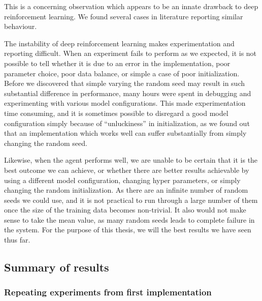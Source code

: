 This is a concerning observation which appears to be an innate drawback to deep reinforcement learning. We found several cases in literature reporting similar behaviour. \cite{rlblogpost}

The instability of deep reinforcement learning makes experimentation and reporting difficult. When an experiment fails to perform as we expected, it is not possible to tell whether it is due to an error in the implementation, poor parameter choice, poor data balance, or simple a case of poor initialization. Before we discovered that simple varying the random seed may result in such substantial difference in performance, many hours were spent in debugging and experimenting with various model configurations. This made experimentation time consuming, and it is sometimes possible to disregard a good model configuration simply because of ``unluckiness'' in initialization, as we found out that an implementation which works well can suffer substantially from simply changing the random seed.

Likewise, when the agent performs well, we are unable to be certain that it is the best outcome we can achieve, or whether there are better results achievable by using a different model configuration, changing hyper parameters, or simply changing the random initialization. As there are an infinite number of random seeds we could use, and it is not practical to run through a large number of them once the size of the training data becomes non-trivial. It also would not make sense to take the mean value, as many random seeds leads to complete failure in the system. For the purpose of this thesis, we will the best results we have seen thus far.
 




\subsection{Summary of results}



\subsubsection{Repeating experiments from first implementation}

